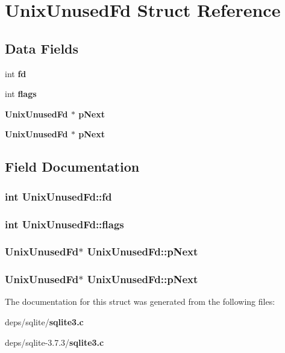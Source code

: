 \section{Unix\-Unused\-Fd Struct Reference}
\label{structUnixUnusedFd}
\subsection*{Data Fields}
\begin{CompactItemize}
\item 
int \bf{fd}
\item 
int \bf{flags}
\item 
\bf{Unix\-Unused\-Fd} $\ast$ \bf{p\-Next}
\item 
\bf{Unix\-Unused\-Fd} $\ast$ \bf{p\-Next}
\end{CompactItemize}


\subsection{Field Documentation}
\subsubsection{\setlength{\rightskip}{0pt plus 5cm}int \bf{Unix\-Unused\-Fd::fd}}\label{structUnixUnusedFd_827acf8059e707c38f5428109785b6a7}


\subsubsection{\setlength{\rightskip}{0pt plus 5cm}int \bf{Unix\-Unused\-Fd::flags}}\label{structUnixUnusedFd_294eb2e8399d71a6cffc1f54f07c970e}


\subsubsection{\setlength{\rightskip}{0pt plus 5cm}\bf{Unix\-Unused\-Fd}$\ast$ \bf{Unix\-Unused\-Fd::p\-Next}}\label{structUnixUnusedFd_a1b1055a0b29ee69a9d0713347b8f002}


\subsubsection{\setlength{\rightskip}{0pt plus 5cm}\bf{Unix\-Unused\-Fd}$\ast$ \bf{Unix\-Unused\-Fd::p\-Next}}\label{structUnixUnusedFd_a1b1055a0b29ee69a9d0713347b8f002}




The documentation for this struct was generated from the following files:\begin{CompactItemize}
\item 
deps/sqlite/\bf{sqlite3.c}\item 
deps/sqlite-3.7.3/\bf{sqlite3.c}\end{CompactItemize}
